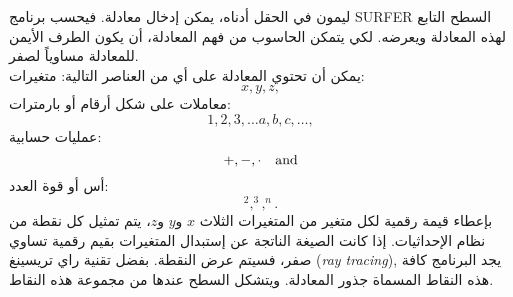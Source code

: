 \begin{surferPage}[ليمون]{ليمون}
في الحقل أدناه، يمكن إدخال معادلة. فيحسب برنامج \textenglish{SURFER} السطح التابع لهذه المعادلة ويعرضه. لكي يتمكن الحاسوب من فهم المعادلة،  أن يكون الطرف الأيمن للمعادلة مساوياً لصفر.
\\
يمكن أن تحتوي المعادلة على أي من العناصر التالية:
\newline
متغيرات:
\[x, y, z, \]
معاملات على شكل أرقام أو بارمترات:
\[1, 2, 3, \dots a, b, c, \dots, \]
عمليات حسابية:
\[+,  - , \cdot \quad \textnormal{and} \]
أس أو قوة العدد:
\[ ^2, ^3, ^n .\]
بإعطاء قيمة رقمية لكل متغير من المتغيرات الثلاث $x$ و$y$ و$z$، يتم تمثيل كل نقطة من نظام الإحداثيات. إذا كانت الصيغة الناتجة عن إستبدال المتغيرات بقيم رقمية تساوي صفر، فسيتم عرض النقطة. بفضل تقنية راي تريسينغ
\textenglish{(\textit{ray tracing})},
يجد البرنامج كافة هذه النقاط المسماة جذور المعادلة. ويتشكل السطح عندها من مجموعة هذه النقاط.
\end{surferPage}
